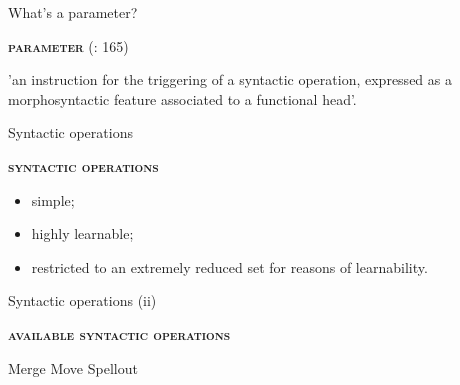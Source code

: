 \documentclass[lesson_slides]{subfiles}
\begin{document}
\begin{frame}[c]{What's a parameter?}

    \textbf{\textsc{parameter}} (\cite{rizzi2017}: 165) \pause
    
    'an instruction for the triggering of a syntactic operation, expressed as a morphosyntactic feature associated to a functional head'.

\end{frame}
\begin{frame}[c]{Syntactic operations}

    \noindent\textbf{\textsc{syntactic operations}} \pause
    \begin{itemize}
        \item[\ding{227}] simple; \pause
        \item[\ding{227}] highly learnable; \pause
        \item[\ding{227}] restricted to an extremely reduced set for reasons of learnability.
    \end{itemize}	
    
\end{frame}
\begin{frame}[c]{Syntactic operations (ii)}

    \noindent\textbf{\textsc{available syntactic operations}} \pause
        \begin{xlist}
            \ex Merge \pause
            \ex Move \pause
            \ex Spellout
        \end{xlist}
\end{frame}
\end{document}
